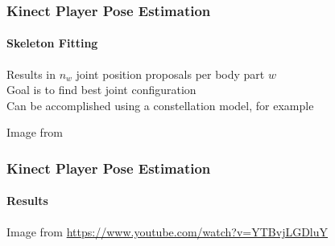 \documentclass[xetex,professionalfont]{beamer}
\begin{document}

\begin{frame}
\frametitle{Kinect Player Pose Estimation}
\framesubtitle{Skeleton Fitting}

Results in $n_w$ joint position proposals per body part $w$\\\medskip %
Goal is to find best joint configuration\\\medskip
Can be accomplished using a constellation model, for example %

\bigskip
\begin{center}
    {\centering Image from \cite{fischler1973}}
\end{center}

\end{frame}


\begin{frame}
\frametitle{Kinect Player Pose Estimation}
\framesubtitle{Results}

\begin{center}
    {\centering Image from \url{https://www.youtube.com/watch?v=YTBvjLGDluY}}
\end{center}

\end{frame}
\end{document}
